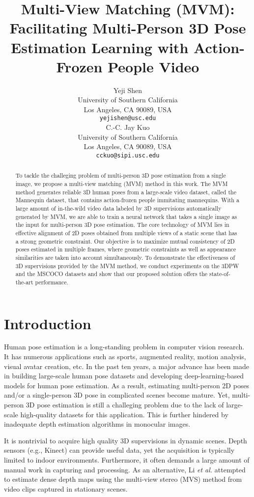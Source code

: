 \documentclass{article}
\title{Multi-View Matching (MVM): Facilitating Multi-Person 3D 
Pose Estimation Learning with Action-Frozen People Video}
\author{
 Yeji Shen \\
  University of Southern California \\ Los Angeles, CA 90089, USA \\
  \texttt{yejishen@usc.edu} \\
\And
 C.-C. Jay Kuo \\
  University of Southern California \\ Los Angeles, CA 90089, USA \\
  \texttt{cckuo@sipi.usc.edu} \\
}
\begin{document}
\maketitle
\begin{abstract}
To tackle the challeging problem of multi-person 3D pose
estimation from a single image, we propose a multi-view matching (MVM)
method in this work. The MVM method generates reliable 3D human poses
from a large-scale video dataset, called the Mannequin dataset, that
contains action-frozen people immitating mannequins.  With a large
amount of in-the-wild video data labeled by 3D supervisions
automatically generated by MVM, we are able to train a neural network
that takes a single image as the input for multi-person 3D pose
estimation.  The core technology of MVM lies in effective alignment of
2D poses obtained from multiple views of a static scene that has a
strong geometric constraint. Our objective is to maximize mutual
consistency of 2D poses estimated in multiple frames, where geometric
constraints as well as appearance similarities are taken into account
simultaneously.  To demonstrate the effectiveness of 3D supervisions
provided by the MVM method, we conduct experiments on the 3DPW and the
MSCOCO datasets and show that our proposed solution offers the
state-of-the-art performance. 

\end{abstract}




\section{Introduction}\label{sec:introduction}

Human pose estimation is a long-standing problem in computer vision
research. It has numerous applications such as sports, augmented
reality, motion analysis, visual avatar creation, etc. In the past ten
years, a major advance has been made in building large-scale human pose
datasets and developing deep-learning-based models for human pose
estimation. As a result, estimating multi-person 2D poses and/or a
single-person 3D pose in complicated scenes become mature. Yet,
multi-person 3D pose estimation is still a challeging problem due to the
lack of large-scale high-quality datasets for this application. This is
further hindered by inadequate depth estimation algorithms in monocular
images. 

It is nontrivial to acquire high quality 3D supervisions in dynamic
scenes. Depth sensors (e.g., Kinect) can provide useful data, yet the
acquisition is typically limited to indoor environments. Furthermore, it
often demands a large amount of manual work in capturing and processing.
As an alternative, Li {\em et al.} \cite{li2019learning} attempted to
estimate dense depth maps using the multi-view stereo (MVS) method from
video clips captured in stationary scenes. 
\end{document}
